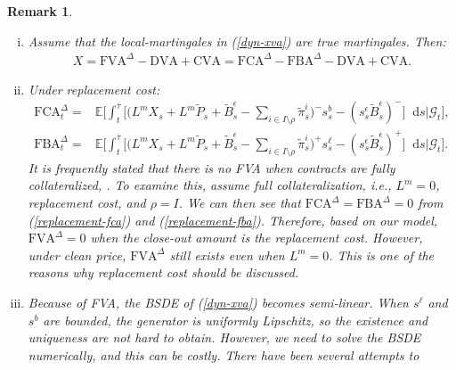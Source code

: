 \documentclass[a4paper, 11pt]{article}              %
\numberwithin{equation}{section}
\theoremstyle{plain}
\newcommand{\FVAd}{\text{FVA}^\Delta}
\newcommand{\FCAd}{\text{FCA}^\Delta}
\newcommand{\btau}{\bar{\tau}}
\newcommand{\1}{\mathds{1}}
\newcommand{\calG}{\mathcal{G}}
\newcommand{\calO}{\mathcal{O}}
\newcommand{\Bt}{\tilde{B}}
\newcommand{\pt}{\tilde{P}}
\newcommand{\dsE}{\mathbb{E}}
\newcommand{\SUM}{\displaystyle\sum}
\theoremstyle{plain}
\theoremstyle{definition}
\newtheorem{remark}[thm]{Remark} %
\theoremstyle{plain}
\newtheorem{remark}{Remark}
\newcommand*\df{\mathop{}\!\mathrm{d}}
\begin{document}
\begin{remark}
\begin{enumerate}[(i)]
\item Assume that the local-martingales in (\ref{dyn-xva}) are true
  martingales. Then:
  \begin{align}
    X= \text{FVA}^\Delta-\text{DVA}+\text{CVA} 
    =\text{FCA}^\Delta-\text{FBA}^\Delta-\text{DVA}+\text{CVA}. \label{remark.xva.decomp}     
  \end{align}
  \iffalse
\item $\calO$ is the opportunity cost of not entering the new contract. In addition,
FCA and FBA is the aggregated funding cost and benefit together with
the \textit{legacy portfolio}. By \cref{fcad} and \cref{fbad},  
the incremental funding impacts are the differences between
aggregated funding adjustments and the opportunity cost.
\fi
\item Under \textit{replacement cost}:
  \begin{align}
    \text{FCA}^\Delta_t =
    & \dsE\bigg[\int_{t}^{\btau}\Big[\big(L^mX_s + L^m\pt_s +\Bt^\epsilon_s
      - \SUM_{i \in I \setminus \rho} \tilde{\pi}^i_s\big)^{-}s^{b}_s - (s^\epsilon_s\Bt^\epsilon_s)^-\Big] \df s\bigg\vert\calG_t\bigg],\label{replacement-fca}\\
    \text{FBA}^\Delta_t =
    & \dsE\bigg[ \int_{t}^{\btau}\Big[\big(L^mX_s + L^m\pt_s +\Bt^\epsilon_s- \SUM_{i \in I \setminus \rho} \tilde{\pi}^i_s\big)^{+}s^{\ell}_s - (s^\epsilon_s\Bt^\epsilon_s)^+\Big]\df s\bigg\vert\calG_t\bigg].      \label{replacement-fba}
  \end{align}
  It is frequently stated that there is no FVA when contracts are fully
  collateralized, \citep[e.g., see][]{cameron2013black}. To examine this, assume
  full collateralization, i.e., $L^m=0$, \textit{replacement cost}, and
  $\rho=I$. We can then see that $\FCAd = \text{FBA}^\Delta = 0$ from
  (\ref{replacement-fca}) and (\ref{replacement-fba}). Therefore, based on our
  model, $\FVAd=0$  when the close-out amount is the
  \textit{replacement cost}. However, under \textit{clean price}, $\FVAd$
  still exists even when $L^m=0$. This is one of the reasons why
  \textit{replacement cost} should be discussed.
  \iffalse
\item Because of FVA, the BSDE of (\ref{dyn-xva}) becomes semi-linear. When
  $s^\ell$ and $s^b$ are bounded, the generator is uniformly Lipschitz, so the
  existence and uniqueness are not hard to obtain. However, we need to solve the
  BSDE numerically, and this can be costly. There have been several attempts to

\end{enumerate}
\end{remark}
\end{document}
